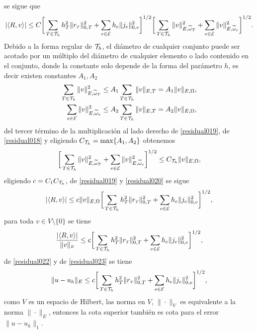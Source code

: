se sigue que 
\begin{equation}\label{residual019}
|\langle R,v \rangle| \leq C \bigg[ \sum_{T\in{\ensuremath{\mathcal{T}}}_{h}} h^{2}_{T}\| r_{\text{\tiny $T$}} \|^{2}_{0,T}  + \sum_{e\in {\ensuremath{\mathcal{E}}}} h_{e}\|j_{e}\|^{2}_{0,e}  \bigg]^{1/2}\bigg[ \sum_{T\in {\ensuremath{\mathcal{T}}}_{h}} \|v\|^{2}_{E,\widetilde{\omega}_{T}}  +  \sum_{e\in {\ensuremath{\mathcal{E}}}}\|v\|^{2}_{E,\widetilde{\omega}_{e}}  \bigg]^{1/2}.
\end{equation}
Debido a la forma regular de ${\mathcal{T}}_{h}$, el di\'ametro de cualquier conjunto puede ser acotado por un m\'ultiplo del di\'ametro de cualquier elemento o lado contenido en el conjunto, donde la constante solo depende de la forma del par\'ametro $h$, es decir existen constantes $A_{1},A_{2}$ 
\begin{equation}\label{residual018}
\begin{split}
\sum_{T\in {\ensuremath{\mathcal{T}}}_{h}} \|v\|^{2}_{E,\widetilde{\omega}_{\text{\tiny $T$}}} &\leq A_{1}\sum_{T\in {\ensuremath{\mathcal{T}}}_{h}} \|v\|_{E,T} = A_{1}\|v\|_{E,\Omega}, \\
\sum_{e\in{\ensuremath{\mathcal{E}}}} \|v\|^{2}_{E,\widetilde{\omega}_{\text{\tiny $e$}}} &\leq A_{2}\sum_{T\in {\ensuremath{\mathcal{T}}}_{h}} \|v\|_{E,T} = A_{2}\|v\|_{E,\Omega}, \\
\end{split}
\end{equation}
del tercer t\'ermino de la multiplicaci\'on al lado derecho de \eqref{residual019}, de  \eqref{residual018} y eligiendo $C_{{\mathcal{T}}_{h}}=\max\{ A_{1},A_{2} \}$ obtenemos 
\begin{equation}\label{residual020}
\bigg[ \sum_{T\in {\ensuremath{\mathcal{T}}}_{h}} \|v\|^{2}_{E,\widetilde{\omega}_{T}}  +  \sum_{e\in {\ensuremath{\mathcal{E}}}}\|v\|^{2}_{E,\widetilde{\omega}_{e}}  \bigg]^{1/2}\leq C_{{\mathcal{T}}_{h}} \|v\|_{E,\Omega},
\end{equation}
eligiendo $c=C_{1}C_{{\mathcal{T}}_{h}}$, de \eqref{residual019} y \eqref{residual020} se sigue 
\begin{equation}
|\langle R,v \rangle|\leq c\|v\|_{E,\Omega}\bigg[ \sum_{T\in{\ensuremath{\mathcal{T}}}_{h}} h^{2}_{T}\| r_{\text{\tiny $T$}} \|^{2}_{0,T}  + \sum_{e\in {\ensuremath{\mathcal{E}}}} h_{e}\|j_{e}\|^{2}_{0,e}  \bigg]^{1/2},
\end{equation}
para toda $v\in V\setminus\{ 0\}$ se tiene 
\begin{equation}\label{residual023}
\frac{|\langle R,v \rangle|}{ \|v\|_{\text{\tiny $E$}} }\leq c\bigg[ \sum_{T\in{\ensuremath{\mathcal{T}}}_{h}} h^{2}_{T}\| r_{\text{\tiny $T$}} \|^{2}_{0,T}  + \sum_{e\in {\ensuremath{\mathcal{E}}}} h_{e}\|j_{e}\|^{2}_{0,e}  \bigg]^{1/2},
\end{equation}
de \eqref{residual022} y de \eqref{residual023} se tiene 
\begin{equation}\label{residual021}
\|u-u_{h}\|_{E}\leq c\bigg[ \sum_{T\in{\ensuremath{\mathcal{T}}}_{h}} h^{2}_{T}\| r_{\text{\tiny $T$}} \|^{2}_{0,T}  + \sum_{e\in {\ensuremath{\mathcal{E}}}} h_{e}\|j_{e}\|^{2}_{0,e}  \bigg]^{1/2},
\end{equation}
como $V$ es un espacio de Hilbert, las norma en $V$, $\| \cdot\|_{V}$ es equivalente a la norma $\|\cdot\|_{E}$, entonces la cota superior tambi\'en es cota para el error $\|u-u_{h}\|_{1}$.

